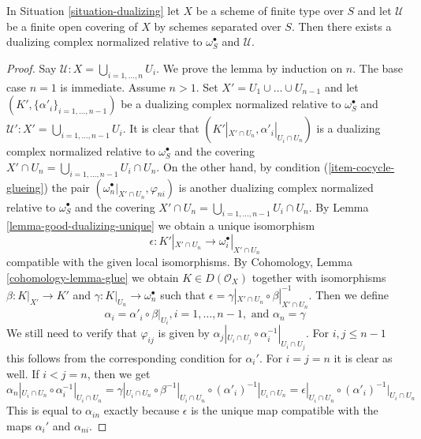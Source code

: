 \begin{lemma}
\label{lemma-existence-good-dualizing}
In Situation \ref{situation-dualizing} let $X$ be a scheme of finite type
over $S$ and let $\mathcal{U}$ be a finite open covering
of $X$ by schemes separated over $S$. Then there exists
a dualizing complex normalized relative to $\omega_S^\bullet$ and
$\mathcal{U}$.
\end{lemma}

\begin{proof}
Say $\mathcal{U} : X = \bigcup_{i = 1, \ldots, n} U_i$.
We prove the lemma by induction on $n$. The base case $n = 1$ is immediate.
Assume $n > 1$. Set $X' = U_1 \cup \ldots \cup U_{n - 1}$
and let $(K', \{\alpha'_i\}_{i = 1, \ldots, n - 1})$
be a dualizing complex normalized relative to $\omega_S^\bullet$
and $\mathcal{U}' : X' = \bigcup_{i = 1, \ldots, n - 1} U_i$.
It is clear that $(K'|_{X' \cap U_n}, \alpha'_i|_{U_i \cap U_n})$
is a dualizing complex normalized relative to $\omega_S^\bullet$
and the covering
$X' \cap U_n = \bigcup_{i = 1, \ldots, n - 1} U_i \cap U_n$.
On the other hand, by condition (\ref{item-cocycle-glueing}) the pair
$(\omega_n^\bullet|_{X' \cap U_n}, \varphi_{ni})$
is another dualizing complex normalized relative to $\omega_S^\bullet$
and the covering
$X' \cap U_n = \bigcup_{i = 1, \ldots, n - 1} U_i \cap U_n$.
By Lemma \ref{lemma-good-dualizing-unique} we obtain a unique isomorphism
$$
\epsilon : K'|_{X' \cap U_n} \longrightarrow \omega_i^\bullet|_{X' \cap U_n}
$$
compatible with the given local isomorphisms.
By Cohomology, Lemma \ref{cohomology-lemma-glue}
we obtain $K \in D(\mathcal{O}_X)$ together with
isomorphisms $\beta : K|_{X'} \to K'$ and
$\gamma : K|_{U_n} \to \omega_n^\bullet$ such that
$\epsilon = \gamma|_{X'\cap U_n} \circ \beta|_{X' \cap U_n}^{-1}$.
Then we define
$$
\alpha_i = \alpha'_i \circ \beta|_{U_i}, i = 1, \ldots, n - 1,
\text{ and }
\alpha_n = \gamma
$$
We still need to verify that $\varphi_{ij}$ is given by
$\alpha_j|_{U_i \cap U_j} \circ \alpha_i^{-1}|_{U_i \cap U_j}$.
For $i, j \leq n - 1$ this follows from the corresponding
condition for $\alpha_i'$. For $i = j = n$ it is clear as well.
If $i < j = n$, then we get
$$
\alpha_n|_{U_i \cap U_n} \circ \alpha_i^{-1}|_{U_i \cap U_n} =
\gamma|_{U_i \cap U_n} \circ \beta^{-1}|_{U_i \cap U_n}
\circ (\alpha'_i)^{-1}|_{U_i \cap U_n} =
\epsilon|_{U_i \cap U_n} \circ (\alpha'_i)^{-1}|_{U_i \cap U_n}
$$
This is equal to $\alpha_{in}$ exactly because $\epsilon$
is the unique map compatible with the maps
$\alpha_i'$ and $\alpha_{ni}$.
\end{proof}

